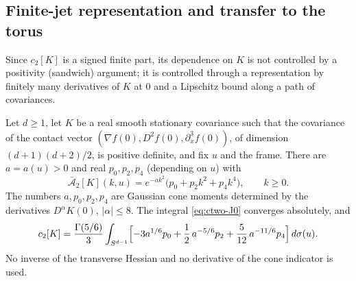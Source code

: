 \subsection{Finite-jet representation and transfer to the torus}\label{ssec:ctwo-transfer}

Since $c_2[K]$ is a signed finite part, its dependence on $K$ is not controlled by a positivity (sandwich) argument; it is controlled through a representation by finitely many derivatives of $K$ at $0$ and a Lipschitz bound along a path of covariances.

\begin{theorem}\label{thm:ctwo-jet}
Let $d\ge1$, let $K$ be a real smooth stationary covariance such that the covariance of the contact vector $(\nabla f(0),D^2f(0),\partial_x^3f(0))$, of dimension $(d+1)(d+2)/2$, is positive definite, and fix $u$ and the frame. There are $a=a(u)>0$ and real $p_0,p_2,p_4$ (depending on $u$) with
\begin{equation}\label{eq:ctwo-J1}
\bar{\mathcal A}_2[K](k,u)=e^{-ak^2}\bigl(p_0+p_2k^2+p_4k^4\bigr),\qquad k\ge0 .
\end{equation}
The numbers $a,p_0,p_2,p_4$ are Gaussian cone moments determined by the derivatives $D^\alpha K(0)$, $|\alpha|\le8$. The integral \eqref{eq:ctwo-J0} converges absolutely, and
\begin{equation}\label{eq:ctwo-J2}
c_2[K]=\frac{\Gamma(5/6)}3\int_{S^{d-1}}\Bigl[-3a^{1/6}p_0+\frac12\,a^{-5/6}p_2+\frac5{12}\,a^{-11/6}p_4\Bigr]\,d\sigma(u).
\end{equation}
No inverse of the transverse Hessian and no derivative of the cone indicator is used.
\end{theorem}

